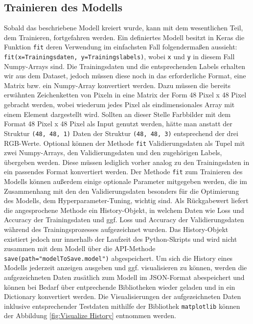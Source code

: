 \documentclass[12pt, a4paper]{scrbook}
\begin{document}
\subsection{Trainieren des Modells}
Sobald das beschriebene Modell kreiert wurde, kann mit dem wesentlichen Teil, dem Trainieren, fortgefahren werden. Ein definiertes Modell besitzt in Keras die Funktion \texttt{fit} deren Verwendung im einfachsten Fall folgendermaßen aussieht: \texttt{fit(x=Trainingsdaten, y=Trainingslabels)}, wobei \texttt{x} und \texttt{y} in diesem Fall Numpy-Arrays sind. Die Trainingsdaten und die entsprechenden Labels erhalten wir aus dem Dataset, jedoch müssen diese noch in das erforderliche Format, eine Matrix bzw. ein Numpy-Array konvertiert werden. Dazu müssen die bereits erwähnten Zeichenketten von Pixeln in eine Matrix der Form 48 Pixel x 48 Pixel gebracht werden, wobei wiederum jedes Pixel als eindimensionales Array mit einem Element dargestellt wird. Sollten an dieser Stelle Farbbilder mit dem Format 48 Pixel x 48 Pixel als Input genutzt werden, hätte man anstatt der Struktur \texttt{(48, 48, 1)} Daten der Struktur \texttt{(48, 48, 3)} entsprechend der drei RGB-Werte. Optional können der Methode \texttt{fit} Validierungsdaten als Tupel mit zwei Numpy-Arrays, den Validierungsdaten und den zugehörigen Labels, übergeben werden. Diese müssen lediglich vorher analog zu den Trainingsdaten in ein passendes Format konvertiert werden.
Der Methode \texttt{fit} zum Trainieren des Modells können außerdem einige optionale Parameter mitgegeben werden, die im Zusammenhang mit den den Validierungsdaten besonders für die Optimierung des Modells, dem Hyperparameter-Tuning, wichtig sind.\newline
Als Rückgabewert liefert die angesprochene Methode ein History-Objekt, in welchem Daten wie Loss und Accuracy der Trainingsdaten und ggf. Loss und Accuracy der Validierungsdaten während des Trainingsprozesses aufgezeichnet wurden. Das History-Objekt existiert jedoch nur innerhalb der Laufzeit des Python-Skripts und wird nicht zusammen mit dem Modell über die API-Methode \texttt{save(path="modelToSave.model")} abgespeichert. Um sich die History eines Modells jederzeit anzeigen ausgeben und ggf. visualisieren zu können, werden die aufgezeichneten Daten zusätlich zum Modell im JSON-Format abespeichert und können bei Bedarf über entprechende Bibliotheken wieder geladen und in ein Dictionary konvertiert werden.\newline
Die Visualisierungen der aufgezeichneten Daten inklusive entsprechender Testdaten mithilfe der Bibliothek \texttt{matplotlib} können der Abbildung \ref{fig:Visualize History} entnommen werden.
\end{document}
